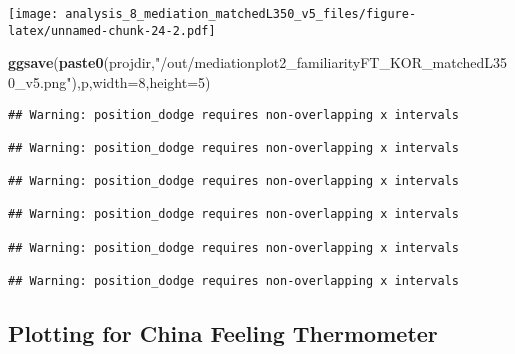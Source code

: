 \documentclass[
]{article}
\newenvironment{Shaded}{\begin{snugshade}}{\end{snugshade}}
\newcommand{\DataTypeTok}[1]{\textcolor[rgb]{0.13,0.29,0.53}{#1}}
\newcommand{\DecValTok}[1]{\textcolor[rgb]{0.00,0.00,0.81}{#1}}
\newcommand{\KeywordTok}[1]{\textcolor[rgb]{0.13,0.29,0.53}{\textbf{#1}}}
\newcommand{\NormalTok}[1]{#1}
\newcommand{\StringTok}[1]{\textcolor[rgb]{0.31,0.60,0.02}{#1}}
\begin{document}
\texttt{[image: analysis\_8\_mediation\_matchedL350\_v5\_files/figure-latex/unnamed-chunk-24-2.pdf]}

\begin{Shaded}
\begin{Highlighting}[]
\KeywordTok{ggsave}\NormalTok{(}\KeywordTok{paste0}\NormalTok{(projdir,}\StringTok{"/out/mediationplot2_familiarityFT_KOR_matchedL350_v5.png"}\NormalTok{),p,}\DataTypeTok{width=}\DecValTok{8}\NormalTok{,}\DataTypeTok{height=}\DecValTok{5}\NormalTok{)}
\end{Highlighting}
\end{Shaded}

\begin{verbatim}
## Warning: position_dodge requires non-overlapping x intervals

## Warning: position_dodge requires non-overlapping x intervals

## Warning: position_dodge requires non-overlapping x intervals

## Warning: position_dodge requires non-overlapping x intervals

## Warning: position_dodge requires non-overlapping x intervals

## Warning: position_dodge requires non-overlapping x intervals
\end{verbatim}

\hypertarget{plotting-for-china-feeling-thermometer}{%
\subsection{Plotting for China Feeling
Thermometer}\label{plotting-for-china-feeling-thermometer}}
\end{document}
